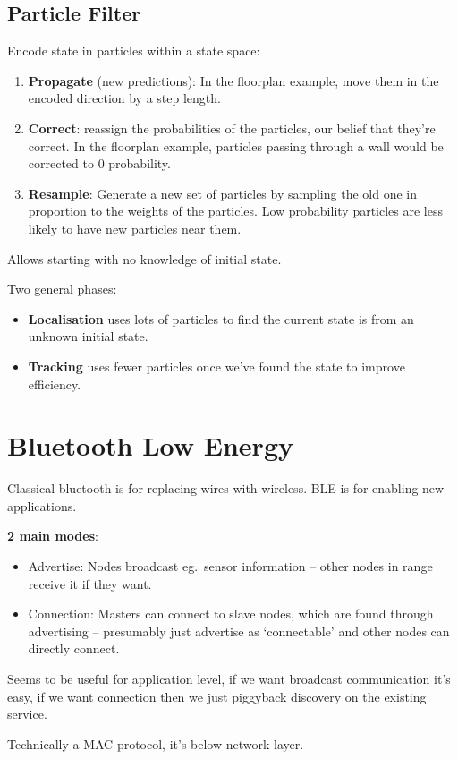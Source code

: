 \documentclass[a4paper, 11pt]{article}
\begin{document}
{    \subsection*{Particle Filter}
    {
        Encode state in particles within a state space:
        \begin{enumerate}
        \item \textbf{Propagate} (new predictions): In the floorplan example, move them in the encoded direction by a step length.
        \item \textbf{Correct}: reassign the probabilities of the particles, our belief that they're correct. In the floorplan example, particles passing through a wall would be corrected to 0 probability.
        \item \textbf{Resample}: Generate a new set of particles by sampling the old one in proportion to the weights of the particles. Low probability particles are less likely to have new particles near them.
        \end{enumerate}

        Allows starting with no knowledge of initial state.

        Two general phases:
        \begin{itemize}
        \item \textbf{Localisation} uses lots of particles to find the current state is from an unknown initial state. 
        \item \textbf{Tracking} uses fewer particles once we've found the state to improve efficiency.
        \end{itemize}
    }
}
\section*{Bluetooth Low Energy}
{
    Classical bluetooth is for replacing wires with wireless. BLE is for enabling new applications.

    \textbf{2 main modes}:
    \begin{itemize}
    \item Advertise: Nodes broadcast eg.\ sensor information -- other nodes in range receive it if they want.
    \item Connection: Masters can connect to slave nodes, which are found through advertising -- presumably just advertise as `connectable' and other nodes can directly connect.
    \end{itemize}

    Seems to be useful for application level, if we want broadcast communication it's easy, if we want connection then we just piggyback discovery on the existing service.

    Technically a MAC protocol, it's below network layer.
}
\end{document}
